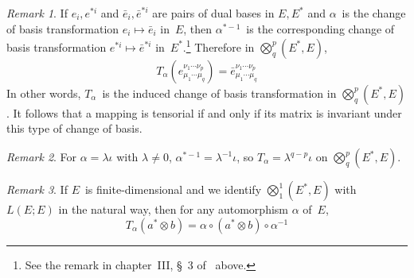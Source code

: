 \documentclass[letterpaper,12pt]{article}
\newcommand{\after}{\circ}
\newcommand{\tprod}{\otimes}
\newcommand{\bigtprod}{\bigotimes}
\newcommand{\medtprod}{{\textstyle\bigtprod}}
\theoremstyle{definition}
\theoremstyle{remark}
\newtheorem*{rmk}{Remark}
\begin{document}
\begin{rmk}
If \(e_i,e^{*i}\) and \(\bar{e}_i,\bar{e}^{*i}\) are pairs of dual bases in \(E,E^*\) and \(\alpha\)~is the change of basis transformation \(e_i\mapsto\bar{e}_i\) in~\(E\), then \(\alpha^{*-1}\)~is the corresponding change of basis transformation \(e^{*i}\mapsto\bar{e}^{*i}\) in~\(E^*\).\footnote{See the remark in chapter~III, \S~3 of~\cite{greub1} above.} Therefore in \(\medtprod^p_q(E^*,E)\),
\[T_{\alpha}(e^{\nu_1\cdots\nu_p}_{\mu_1\cdots\mu_q})=\bar{e}^{\nu_1\cdots\nu_p}_{\mu_1\cdots\mu_q}\]
In other words, \(T_{\alpha}\)~is the induced change of basis transformation in \(\medtprod^p_q(E^*,E)\). It follows that a mapping is tensorial if and only if its matrix is invariant under this type of change of basis.
\end{rmk}

\begin{rmk}
For \(\alpha=\lambda\iota\) with \(\lambda\ne0\), \(\alpha^{*-1}=\lambda^{-1}\iota\), so \(T_{\alpha}=\lambda^{q-p}\iota\) on \(\medtprod^p_q(E^*,E)\).
\end{rmk}

\begin{rmk}
If \(E\)~is finite-dimensional and we identify \(\medtprod^1_1(E^*,E)\) with \(L(E;E)\) in the natural way, then for any automorphism \(\alpha\) of~\(E\),
\[T_{\alpha}(a^*\tprod b)=\alpha\after(a^*\tprod b)\after\alpha^{-1}\]
\end{rmk}
\end{document}
